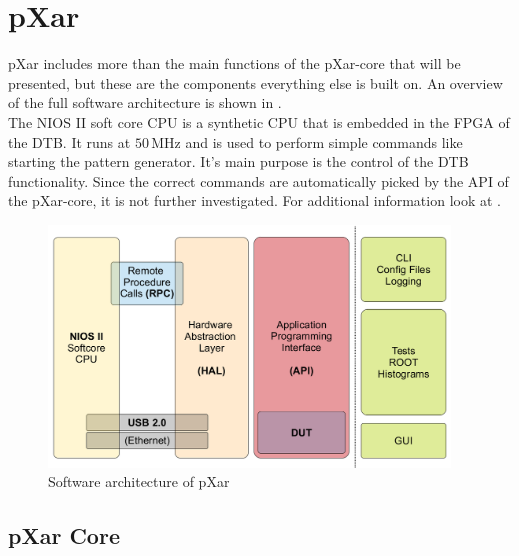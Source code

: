 \documentclass[british,11pt,a4paper]{memoir}
\begin{document}
\section{pXar}
pXar includes more than the main functions of the pXar-core that will be presented, but these are the components everything else is built on. An overview of the full software architecture is shown in .\\
The NIOS II soft core \ac{CPU} is a synthetic \ac{CPU} that is embedded in the \ac{FPGA} of the \ac{DTB}. It runs at $50\,$MHz and is used to perform simple commands like starting the pattern generator. It's main purpose is the control of the \ac{DTB} functionality. Since the correct commands are automatically picked by the \ac{API} of the pXar-core, it is not further investigated. For additional information look at \cite{spannagel}.
\begin{figure}[ht]
	\includegraphics[width=0.95\textwidth]{pxar_scheme}
	\caption{Software architecture of pXar \cite{spannagel}}
	\label{p13}
\end{figure}
\subsection{pXar Core}
\end{document}
